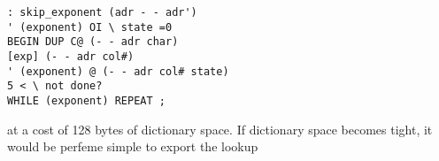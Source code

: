 \documentclass{book}
\begin{document}
\begin{lstlisting}
: skip_exponent (adr - - adr')
' (exponent) OI \ state =0
BEGIN DUP C@ (- - adr char)
[exp] (- - adr col#)
' (exponent) @ (- - adr col# state)
5 < \ not done?
WHILE (exponent) REPEAT ;
\end{lstlisting}

at a cost of 128 bytes of dictionary space. If dictionary space
becomes tight, it would be perfeme simple to export the lookup
\end{document}
